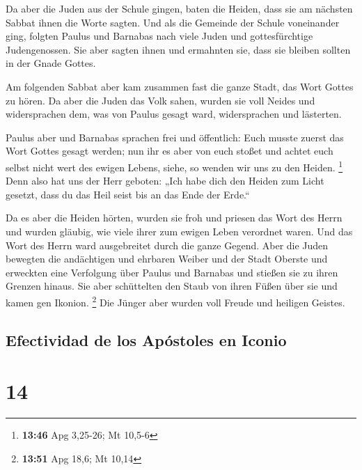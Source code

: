  Da aber die Juden aus der Schule gingen, baten die
Heiden, dass sie am nächsten Sabbat ihnen die Worte sagten.
 Und als die Gemeinde der Schule voneinander ging,
folgten Paulus und Barnabas nach viele Juden und gottesfürchtige
Judengenossen. Sie aber sagten ihnen und ermahnten sie, dass sie bleiben
sollten in der Gnade Gottes.

 Am folgenden Sabbat aber kam zusammen fast die ganze
Stadt, das Wort Gottes zu hören.  Da aber die Juden das
Volk sahen, wurden sie voll Neides und widersprachen dem, was von Paulus
gesagt ward, widersprachen und lästerten.

 Paulus aber und Barnabas sprachen frei und öffentlich:
Euch musste zuerst das Wort Gottes gesagt werden; nun ihr es aber von
euch stoßet und achtet euch selbst nicht wert des ewigen Lebens, siehe,
so wenden wir uns zu den Heiden. \footnote{\textbf{13:46} Apg 3,25-26;
  Mt 10,5-6}  Denn also hat uns der Herr geboten: „Ich
habe dich den Heiden zum Licht gesetzt, dass du das Heil seist bis an
das Ende der Erde.``

 Da es aber die Heiden hörten, wurden sie froh und
priesen das Wort des Herrn und wurden gläubig, wie viele ihrer zum
ewigen Leben verordnet waren.  Und das Wort des Herrn
ward ausgebreitet durch die ganze Gegend.  Aber die Juden
bewegten die andächtigen und ehrbaren Weiber und der Stadt Oberste und
erweckten eine Verfolgung über Paulus und Barnabas und stießen sie zu
ihren Grenzen hinaus.  Sie aber schüttelten den Staub von
ihren Füßen über sie und kamen gen Ikonion. \footnote{\textbf{13:51} Apg
  18,6; Mt 10,14}  Die Jünger aber wurden voll Freude und
heiligen Geistes.

\hypertarget{efectividad-de-los-apuxf3stoles-en-iconio}{%
\subsection{Efectividad de los Apóstoles en
Iconio}\label{efectividad-de-los-apuxf3stoles-en-iconio}}

\hypertarget{section-13}{%
\section{14}\label{section-13}}

